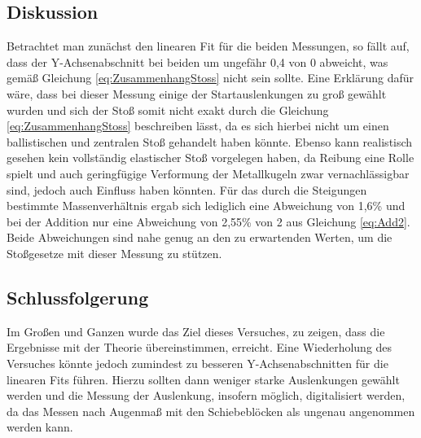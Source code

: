 	\subsection{Diskussion}
		
		Betrachtet man zunächst den linearen Fit für die beiden Messungen, so fällt auf, dass der Y-Achsenabschnitt bei beiden um ungefähr 0,4 von 0 abweicht, was gemäß Gleichung \ref{eq:ZusammenhangStoss} nicht sein sollte. Eine Erklärung dafür wäre, dass bei dieser Messung einige der Startauslenkungen zu groß gewählt wurden und sich der Stoß somit nicht exakt durch die Gleichung \ref{eq:ZusammenhangStoss} beschreiben lässt, da es sich hierbei nicht um einen ballistischen und zentralen Stoß gehandelt haben könnte. Ebenso kann realistisch gesehen kein vollständig elastischer Stoß vorgelegen haben, da Reibung eine Rolle spielt und auch geringfügige Verformung der Metallkugeln zwar vernachlässigbar sind, jedoch auch Einfluss haben könnten.
		Für das durch die Steigungen bestimmte Massenverhältnis ergab sich lediglich eine Abweichung von 1,6\% und bei der Addition nur eine Abweichung von 2,55\% von 2 aus Gleichung \ref{eq:Add2}. Beide Abweichungen sind nahe genug an den zu erwartenden Werten, um die Stoßgesetze mit dieser Messung zu stützen. 
		
	\subsection{Schlussfolgerung}
	
		Im Großen und Ganzen wurde das Ziel dieses Versuches, zu zeigen, dass die Ergebnisse mit der Theorie übereinstimmen, erreicht. Eine Wiederholung des Versuches könnte jedoch zumindest zu besseren Y-Achsenabschnitten für die linearen Fits führen. Hierzu sollten dann weniger starke Auslenkungen gewählt werden und die Messung der Auslenkung, insofern möglich, digitalisiert werden, da das Messen nach Augenmaß mit den Schiebeblöcken als ungenau angenommen werden kann.